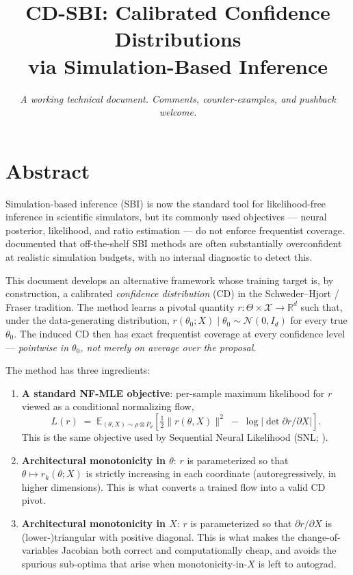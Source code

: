 \documentclass[11pt]{article}
\title{\Large\bfseries CD-SBI: Calibrated Confidence Distributions \\ via Simulation-Based Inference}
\author{}
\date{\normalsize\itshape A working technical document. Comments, counter-examples, and pushback welcome.}
\providecommand{\tightlist}{\setlength{\itemsep}{0pt}\setlength{\parskip}{0pt}}
\begin{document}
\maketitle

\thispagestyle{empty}
\vspace{1em}

\section*{Abstract}

Simulation-based inference (SBI) is now the standard tool for
likelihood-free inference in scientific simulators, but its commonly
used objectives --- neural posterior, likelihood, and ratio estimation
--- do not enforce frequentist coverage. \citet{HermansEtAl2022}
documented that off-the-shelf SBI methods are often substantially
overconfident at realistic simulation budgets, with no internal
diagnostic to detect this.

This document develops an alternative framework whose training target
is, by construction, a calibrated \emph{confidence distribution} (CD) in
the Schweder--Hjort / Fraser tradition. The method learns a pivotal
quantity \(r: \Theta \times \mathcal{X} \to \mathbb{R}^d\) such that,
under the data-generating distribution,
\(r(\theta_0; X) \mid \theta_0 \sim \mathcal{N}(0, I_d)\) for every true
\(\theta_0\). The induced CD then has exact frequentist coverage at
every confidence level --- \emph{pointwise in \(\theta_0\), not merely
on average over the proposal.}

The method has three ingredients:

\begin{enumerate}
\def\labelenumi{\arabic{enumi}.}
\tightlist
\item
  \textbf{A standard NF-MLE objective}: per-sample maximum likelihood
  for \(r\) viewed as a conditional normalizing flow,
  \[L(r) \;=\; \mathbb{E}_{(\theta, X) \sim \rho \otimes P_\theta}\!\left[\tfrac{1}{2}\|r(\theta, X)\|^2 \;-\; \log\bigl|\det \partial r/\partial X\bigr|\right].\]
  This is the same objective used by Sequential Neural Likelihood (SNL;
  \citealp{PapamakariosEtAl2019}).
\item
  \textbf{Architectural monotonicity in \(\theta\)}: \(r\) is
  parameterized so that \(\theta \mapsto r_k(\theta; X)\) is strictly
  increasing in each coordinate (autoregressively, in higher
  dimensions). This is what converts a trained flow into a valid CD
  pivot.
\item
  \textbf{Architectural monotonicity in \(X\)}: \(r\) is parameterized
  so that \(\partial r/\partial X\) is (lower-)triangular with positive
  diagonal. This is what makes the change-of-variables Jacobian both
  correct and computationally cheap, and avoids the spurious sub-optima
  that arise when monotonicity-in-\(X\) is left to autograd.
\end{enumerate}
\end{document}
